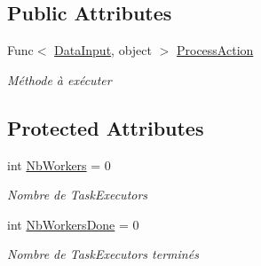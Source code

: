 \subsection*{Public Attributes}
\begin{DoxyCompactItemize}
\item 
Func$<$ \hyperlink{class_node_net_1_1_data_1_1_data_input}{Data\+Input}, object $>$ \hyperlink{class_node_net_1_1_tasks_1_1_task_executor_ab2e733e72e161cbfcb6394d2f646903f}{Process\+Action}
\begin{DoxyCompactList}\small\item\em Méthode à exécuter \end{DoxyCompactList}\end{DoxyCompactItemize}
\subsection*{Protected Attributes}
\begin{DoxyCompactItemize}
\item 
int \hyperlink{class_node_net_1_1_tasks_1_1_task_executor_a269ae65a85a59965fe02aef617c6ce44}{Nb\+Workers} = 0
\begin{DoxyCompactList}\small\item\em Nombre de Task\+Executors \end{DoxyCompactList}\item 
int \hyperlink{class_node_net_1_1_tasks_1_1_task_executor_a81903df43be23bec69be758db8a66678}{Nb\+Workers\+Done} = 0
\begin{DoxyCompactList}\small\item\em Nombre de Task\+Executors terminés \end{DoxyCompactList}\end{DoxyCompactItemize}
